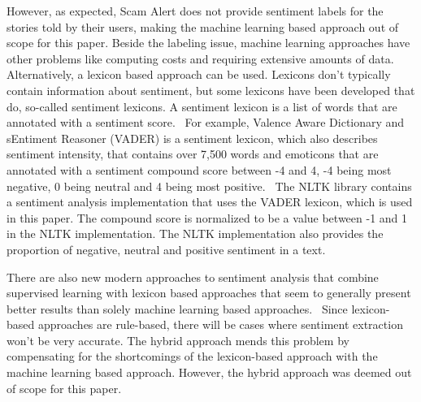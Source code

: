 However, as expected, Scam Alert does not provide sentiment labels for the stories told by their users, making the machine learning based approach out of scope for this paper. Beside the labeling issue, machine learning approaches have other problems like computing costs and requiring extensive amounts of data.~\cite{hutto2014vader} Alternatively, a lexicon based approach can be used. Lexicons don't typically contain information about sentiment, but some lexicons have been developed that do, so-called sentiment lexicons. A sentiment lexicon is a list of words that are annotated with a sentiment score.~\cite{bonta2019comprehensive} For example, Valence Aware Dictionary and sEntiment Reasoner (VADER) is a sentiment lexicon, which also describes sentiment intensity, that contains over 7,500 words and emoticons that are annotated with a sentiment compound score between -4 and 4, -4 being most negative, 0 being neutral and 4 being most positive.~\cite{hutto2014vader} The NLTK library contains a sentiment analysis implementation that uses the VADER lexicon, which is used in this paper. The compound score is normalized to be a value between -1 and 1 in the NLTK implementation. The NLTK implementation also provides the proportion of negative, neutral and positive sentiment in a text.

\begin{table}
    \centering
    \caption{Examples of sentiment analysis results on different unprocessed texts.}
    \label{tab:sentiment_analysis_example}
\end{table}

There are also new modern approaches to sentiment analysis that combine supervised learning with lexicon based approaches that seem to generally present better results than solely machine learning based approaches.~\cite{ahmad2017hybrid} Since lexicon-based approaches are rule-based, there will be cases where sentiment extraction won't be very accurate. The hybrid approach mends this problem by compensating for the shortcomings of the lexicon-based approach with the machine learning based approach. However, the hybrid approach was deemed out of scope for this paper.

